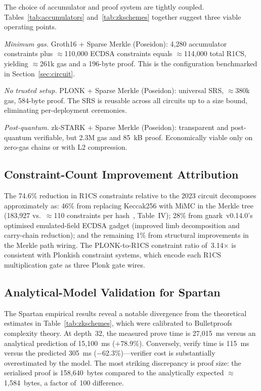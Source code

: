 \documentclass[conference]{IEEEtran}
\begin{document}
The choice of accumulator and proof system are tightly coupled.
Tables~\ref{tab:accumulators} and~\ref{tab:zkschemes} together
suggest three viable operating points.

\emph{Minimum gas.} Groth16 + Sparse Merkle (Poseidon):
4,280 accumulator constraints plus $\approx$110,000 ECDSA constraints
equals $\approx$114,000 total R1CS, yielding $\approx$261k gas and a
196-byte proof.
This is the configuration benchmarked in Section~\ref{sec:circuit}.

\emph{No trusted setup.} PLONK + Sparse Merkle (Poseidon):
universal SRS, $\approx$380k gas, 584-byte proof.
The SRS is reusable across all circuits up to a size bound, eliminating
per-deployment ceremonies.

\emph{Post-quantum.} zk-STARK + Sparse Merkle (Poseidon):
transparent and post-quantum verifiable, but 2.3M gas and 85~kB proof.
Economically viable only on zero-gas chains or with L2 compression.

\subsection{Constraint-Count Improvement Attribution}

The 74.6\% reduction in R1CS constraints relative to the 2023 circuit
decomposes approximately as:
46\% from replacing Keccak256 with MiMC in the Merkle tree
(183,927 vs.\ $\approx$110 constraints per hash~\cite{Kravchenko2023},
Table~IV);
28\% from gnark~v0.14.0's optimised emulated-field ECDSA gadget
(improved limb decomposition and carry-chain reduction);
and the remaining 1\% from structural improvements in the Merkle path wiring.
The PLONK-to-R1CS constraint ratio of~3.14$\times$ is consistent with
Plonkish constraint systems, which encode each R1CS multiplication gate
as three Plonk gate wires.

\subsection{Analytical-Model Validation for Spartan}

The Spartan empirical results reveal a notable divergence from the
theoretical estimates in Table~\ref{tab:zkschemes}, which were calibrated
to Bulletproofs complexity theory.
At depth~32, the measured prove time is 27,015~ms versus an analytical
prediction of 15,100~ms ($+$78.9\%).
Conversely, verify time is 115~ms versus the predicted 305~ms
($-$62.3\%)---verifier cost is substantially overestimated by the model.
The most striking discrepancy is proof size: the serialised proof
is 158,640~bytes compared to the analytically expected $\approx$1,584~bytes,
a factor of~100 difference.
\end{document}
